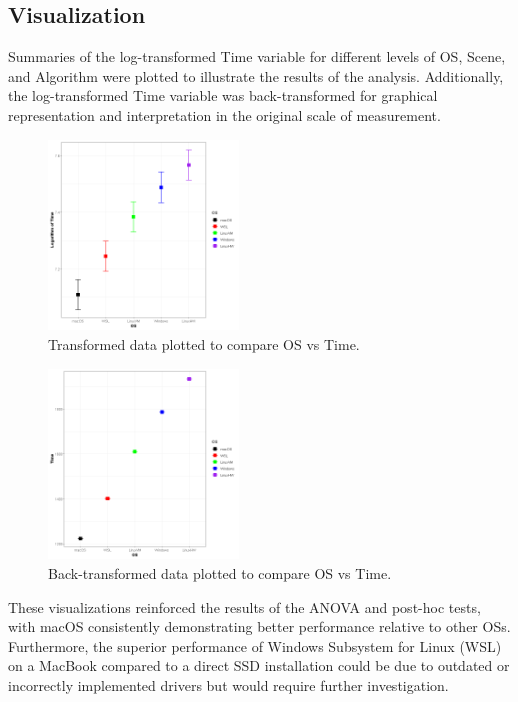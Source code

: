 \documentclass[conference]{IEEEtran}
\begin{document}
\subsection{Visualization}

Summaries of the log-transformed Time variable for different levels of OS, Scene, and Algorithm were plotted to illustrate the results of the analysis. Additionally, the log-transformed Time variable was back-transformed for graphical representation and interpretation in the original scale of measurement.

\begin{figure}[H]
    \label{int-scene-os}
    \centering
    \includegraphics[width=0.45\textwidth]{images/image8.png}
    \caption{Transformed data plotted to compare OS vs Time.}
\end{figure}

\begin{figure}[H]
    \label{int-scene-os}
    \centering
    \includegraphics[width=0.45\textwidth]{images/image9.png}
    \caption{Back-transformed data plotted to compare OS vs Time.}
\end{figure}

These visualizations reinforced the results of the ANOVA and post-hoc tests, with macOS consistently demonstrating better performance relative to other OSs. Furthermore, the superior performance of Windows Subsystem for Linux (WSL) on a MacBook compared to a direct SSD installation could be due to outdated or incorrectly implemented drivers but would require further investigation.
\end{document}
